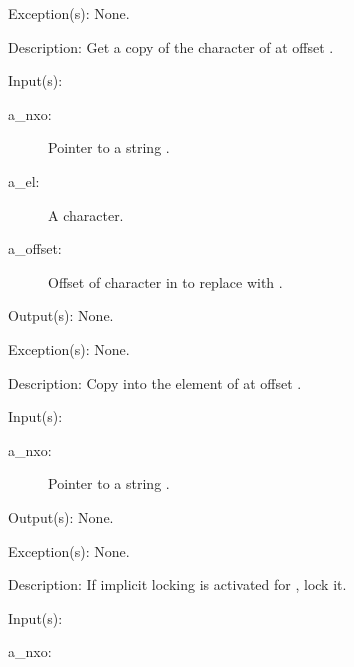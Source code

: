 \begin{capi}
\begin{capilist}
	\item[Exception(s): ] None.
	\item[Description: ]
		Get a copy of the character of  at offset
		.
	\end{capilist}
\label{nxo_string_el_set}
	\begin{capilist}
	\item[Input(s): ]
		\begin{description}\item[]
		\item[a\_nxo: ]
			Pointer to a string .
		\item[a\_el: ]
			A character.
		\item[a\_offset: ]
			Offset of character in  to replace with
			.
		\end{description}
	\item[Output(s): ] None.
	\item[Exception(s): ] None.
	\item[Description: ]
		Copy  into the element of  at offset
		.
	\end{capilist}
\label{nxo_string_lock}
	\begin{capilist}
	\item[Input(s): ]
		\begin{description}\item[]
		\item[a\_nxo: ]
			Pointer to a string \classname{nxo}.
		\end{description}
	\item[Output(s): ] None.
	\item[Exception(s): ] None.
	\item[Description: ]
		If implicit locking is activated for , lock it.
	\end{capilist}
\label{nxo_string_unlock}
	\begin{capilist}
	\item[Input(s): ]
		\begin{description}\item[]
		\item[a\_nxo: ]

\end{description}
\end{capilist}
\end{capi}
